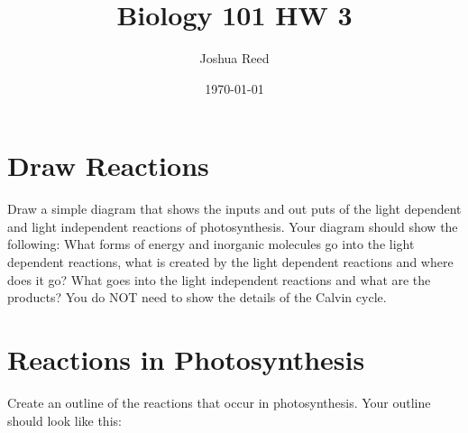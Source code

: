 \documentclass[a4paper]{article}
\title{Biology 101 HW 3}
\author{Joshua Reed}
\date{\today}
\begin{document}
\maketitle

\section{Draw Reactions}

Draw a simple diagram that shows the inputs and out puts of the light dependent and 
light independent reactions of photosynthesis. Your diagram should show the following: 
What forms of energy and inorganic molecules go into the light dependent reactions, what is 
created by the light dependent reactions and where does it go? What goes into the light 
independent reactions and what are the products? You do NOT need to show the details of the Calvin 
cycle.

\newpage 

\section{Reactions in Photosynthesis} 
Create an outline of the reactions that occur in photosynthesis. Your outline should look like this: 
\end{document}
